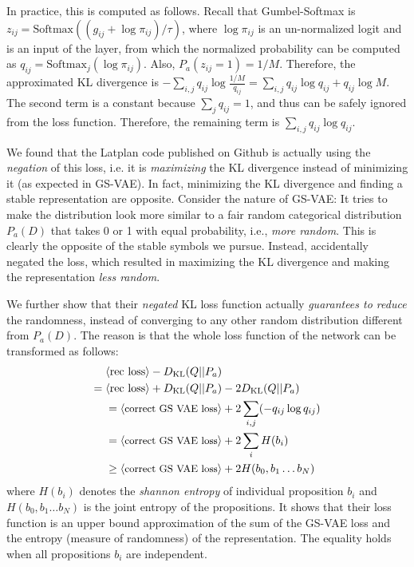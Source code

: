 In practice, this is computed as follows.
Recall that Gumbel-Softmax is $z_{ij} = \text{Softmax}((g_{ij}+\log \pi_{ij})/\tau)$,
where $\log \pi_{ij}$ is an un-normalized logit and is an input of the layer,
from which the normalized probability can be computed as $q_{ij}=\text{Softmax}_j(\log \pi_{ij})$.
Also, $P_a(z_{ij}=1)= 1/M$.
% 
Therefore, the approximated KL divergence is
$-\sum_{i,j} q_{ij} \log \frac{1/M}{q_{ij}} = \sum_{i,j} q_{ij} \log q_{ij} + q_{ij} \log M$.
The second term is a constant because $\sum_j q_{ij} = 1$,
and thus can be safely ignored from the loss function.
Therefore, the remaining term is $\sum_{i,j} q_{ij} \log q_{ij}$.

We found that the Latplan code published on Github is actually using the \emph{negation} of this loss,
i.e. it is \emph{maximizing} the KL divergence instead of minimizing it (as expected in GS-VAE).
In fact, minimizing the KL divergence and finding a stable representation are opposite.
Consider the nature of GS-VAE:
It tries to make the distribution look more similar to a fair random categorical distribution $P_a(D)$
that takes 0 or 1 with equal probability, i.e., \emph{more random}.
This is clearly the opposite of the stable symbols we pursue.
Instead, \citeauthor{Asai2018} accidentally negated the loss, which resulted in
maximizing the KL divergence and making the representation \emph{less random}.

We further show that their \emph{negated} KL loss function
actually \emph{guarantees to reduce} the randomness,
instead of converging to any other random distribution different from $P_a(D)$.
The reason is that the whole loss function of the network can be transformed as follows:
\begin{align*} 
 \brackets{\text{rec loss}}-D_{\text{KL}}(Q||P_a)&                                         \\
=\brackets{\text{rec loss}}+D_{\text{KL}}(Q||P_a)&- 2 D_{\text{KL}}(Q||P_a)                \\
=\brackets{\text{\small correct GS VAE loss}}& + 2 \sum_{i,j} (- q_{ij} \log q_{ij})      \\
=\brackets{\text{\small correct GS VAE loss}}& + 2 \sum_{i} H(b_i)                        \\
\geq\brackets{\text{\small correct GS VAE loss}}& + 2 H(b_0,b_1\ldots b_N)
\end{align*}
where $H(b_i)$ denotes the \emph{shannon entropy} of individual proposition $b_i$ and
$H(b_0,b_1\ldots b_N)$ is the joint entropy of the propositions.
It shows that their loss function is an upper bound approximation of
the sum of the GS-VAE loss and the entropy (measure of randomness) of the representation.
The equality holds when all propositions $b_i$ are independent.

